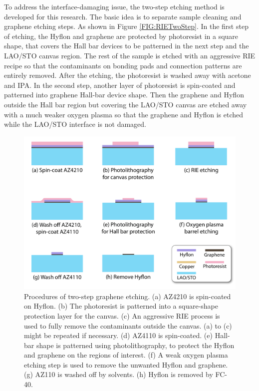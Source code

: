 \documentclass[pdflatex, sectionletters, 12pt, final, phd]{pittetd}    %
\begin{document}
To address the interface-damaging issue, the two-step etching method is developed for this research. The basic idea is to separate sample cleaning and graphene etching steps. As shown in Figure \ref{FIG:RIETwoStep}. In the first step of etching, the Hyflon and graphene are protected by photoresist in a square shape, that covers the Hall bar devices to be patterned in the next step and the LAO/STO canvas region. The rest of the sample is etched with an aggressive RIE recipe so that the contaminants on bonding pads and connection patterns are entirely removed. After the etching, the photoresist is washed away with acetone and IPA. In the second step, another layer of photoresist is spin-coated and patterned into graphene Hall-bar device shape. Then the graphene and Hyflon outside the Hall bar region but covering the LAO/STO canvas are etched away with a much weaker oxygen plasma so that the graphene and Hyflon is etched while the LAO/STO interface is not damaged.

\begin{figure}[p]
	\centering
	\includegraphics[width=.75\textwidth]{Drawing/TwoStepEtching.pdf}
	\caption[Procedures of two-step graphene etching]{Procedures of two-step graphene etching. (a) AZ4210 is spin-coated on Hyflon. (b) The photoresist is patterned into a square-shape protection layer for the canvas. (c) An aggressive RIE process is used to fully remove the contaminants outside the canvas. (a) to (c) might be repeated if necessary. (d) AZ4110 is spin-coated. (e) Hall-bar shape is patterned using photolithography, to protect the Hyflon and graphene on the regions of interest. (f) A weak oxygen plasma etching step is used to remove the unwanted Hyflon and graphene. (g) AZ110 is washed off by solvents. (h) Hyflon is removed by FC-40.}
	\label{FIG:TwoStepEtching}
\end{figure}
\end{document}
